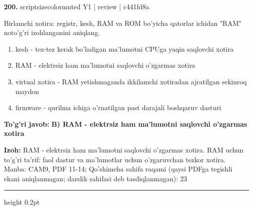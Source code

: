 \documentclass[10pt,a4paper]{article}
\begin{document}
{\bfseries\sffamily\color{ink} 200.} {scriptsizecolor{muted} Y1 | review | c441fd8a}
\par
Birlamchi xotira: registr, kesh, RAM va ROM bo'yicha qatorlar ichidan "RAM" noto'g'ri izohlanganini aniqlang.
\begin{enumerate}[label=\Alph*),leftmargin=9mm]
\item kesh - tez-tez kerak bo'ladigan ma'lumotni CPUga yaqin saqlovchi xotira
\item RAM - elektrsiz ham ma'lumotni saqlovchi o'zgarmas xotira
\item virtual xotira - RAM yetishmaganda ikkilamchi xotiradan ajratilgan sekinroq maydon
\item firmware - qurilma ichiga o'rnatilgan past darajali boshqaruv dasturi
\end{enumerate}
\begin{tcolorbox}[enhanced,breakable,colback=teal!4,colframe=teal!60!black,boxrule=0.45pt,arc=1.2mm,left=2.7mm,right=2.7mm,top=1.8mm,bottom=1.8mm,before skip=2mm,after skip=2mm]
{\bfseries\sffamily\color{teal}To'g'ri javob:} \textbf{B) RAM - elektrsiz ham ma'lumotni saqlovchi o'zgarmas xotira}
\par\smallskip
{\bfseries Izoh:} RAM - elektrsiz ham ma'lumotni saqlovchi o'zgarmas xotira. RAM uchun to'g'ri ta'rif: faol dastur va ma'lumotlar uchun o'zgaruvchan tezkor xotira. Manba: CAM9, PDF 11-14; Qo'shimcha sahifa raqami (qaysi PDFga tegishli ekani aniqlanmagan; darslik sahifasi deb tasdiqlanmagan): 23
\end{tcolorbox}
\vspace{2mm}\hrule height 0.2pt\vspace{3mm}
\end{document}
